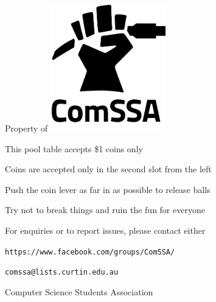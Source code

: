 \documentclass[a4paper]{minimal}
\begin{document}
\fontsize{35.83pt}{1em}
\selectfont

\begin{center}
	Property of
	\hspace{1cm}
	\raisebox{-.5\height}
	{\includegraphics[width=5cm]{logo/comssalogo_black_large.png}}
\end{center}

\fontsize{24.88pt}{1.1em}
\selectfont

\begin{list}{\textbullet\hspace{0.5em}}{}
	\item This pool table accepts \$1 coins only
	\item Coins are accepted only in the second slot from the left
	\item Push the coin lever as far in as possible to release balls
	\item Try not to break things and ruin the fun for everyone
	\item For enquiries or to report issues, please contact either
	\begin{list}{\hspace{1.5em}\textbullet\hspace{0.5em}}{}
		\item \texttt{https://www.facebook.com/groups/ComSSA/}
		\item \texttt{comssa@lists.curtin.edu.au}
	\end{list}
\end{list}

\fontsize{12pt}{1em}
\selectfont

\begin{center}
	Computer Science Students Association
\end{center}
\end{document}
